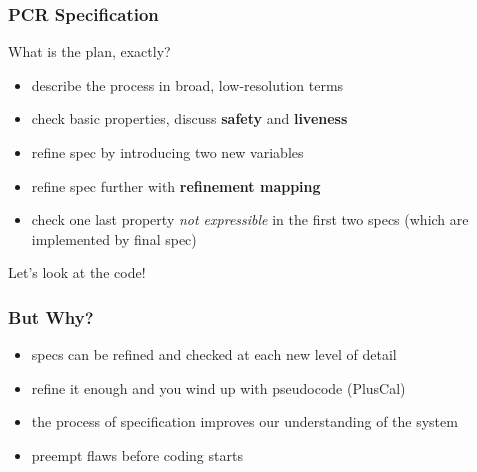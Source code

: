 \documentclass[
        11pt, %
]{beamer}
\begin{document}
\begin{frame}
    \frametitle{PCR Specification}
    What is the plan, exactly?

    \begin{itemize}
        \item describe the process in broad, low-resolution terms
        \item check basic properties, discuss {\bf safety} and {\bf liveness}
        \item refine spec by introducing two new variables
        \item refine spec further with {\bf refinement mapping}
        \item check one last property \emph{not expressible} in the first two specs (which are implemented by final spec)
    \end{itemize}
    Let's look at the code!
\end{frame}

\begin{frame}
    \frametitle{But Why?} 
        \begin{itemize}
            \item specs can be refined and checked at each new level of detail
            \item refine it enough and you wind up with pseudocode (PlusCal)
            \item the process of specification improves our understanding of the system
            \item preempt flaws before coding starts
        \end{itemize}
\end{frame}
\end{document}
